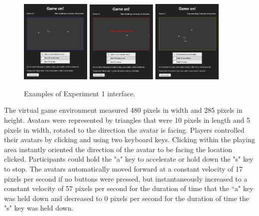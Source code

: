 \documentclass[12pt,letterpaper]{article}
\begin{document}
\begin{figure}
  \centering
  \includegraphics[width=0.3\textwidth]{./figures/experiment-3-no-score}
\includegraphics[width=0.3\textwidth]{./figures/experiment-3-wall}
  \includegraphics[width=0.3\textwidth]{./figures/experiment-3-score}


  \hspace{0.1cm}
  \caption{Examples of Experiment 1 interface.}
  \label{fig:score}
\end{figure}

The virtual game environment measured 480 pixels in width and 285 pixels in height. 
Avatars were represented by triangles that were 10 pixels in length and 5 pixels in width, rotated to the direction the avatar is facing. Players controlled their avatars by clicking and using two keyboard keys. 
Clicking within the playing area instantly oriented the direction of the avatar to be facing the location clicked. 
Participants could hold the "a" key to accelerate or hold down the "s" key to stop.  
The avatars automatically moved forward at a constant velocity of 17 pixels per second if no buttons were pressed, but instantaneously increased to a constant velocity of 57 pixels per second for the duration of time that the ``a" key was held down and decreased to 0 pixels per second for the duration of time the "s" key was held down. 
\end{document}
